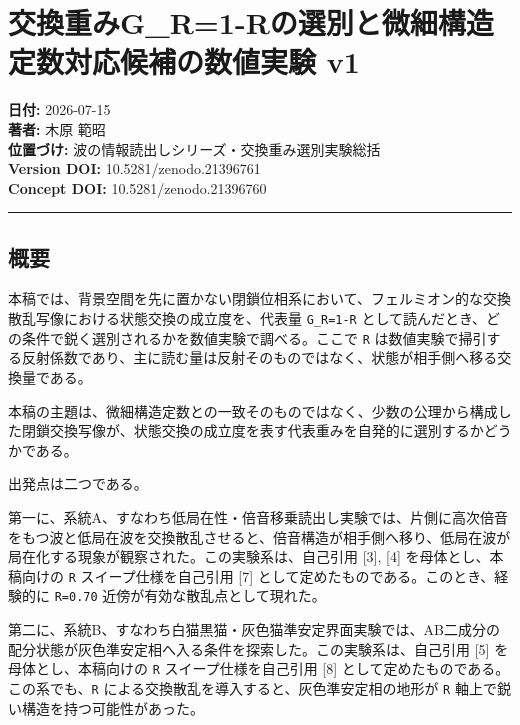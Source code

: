 \documentclass[
]{article}
\author{}
\date{}
\begin{document}
\section{交換重みG\_R=1-Rの選別と微細構造定数対応候補の数値実験
v1}\label{ux4ea4ux63dbux91cdux307fg_r1-rux306eux9078ux5225ux3068ux5faeux7d30ux69cbux9020ux5b9aux6570ux5bfeux5fdcux5019ux88dcux306eux6570ux5024ux5b9fux9a13-v1}

\textbf{日付:} 2026-07-15\\
\textbf{著者:} 木原 範昭\\
\textbf{位置づけ:} 波の情報読出しシリーズ・交換重み選別実験総括\\
\textbf{Version DOI:} 10.5281/zenodo.21396761\\
\textbf{Concept DOI:} 10.5281/zenodo.21396760

\begin{center}\rule{0.5\linewidth}{0.5pt}\end{center}

\subsection{概要}\label{ux6982ux8981}

本稿では、背景空間を先に置かない閉鎖位相系において、フェルミオン的な交換散乱写像における状態交換の成立度を、代表量
\texttt{G\_R=1-R}
として読んだとき、どの条件で鋭く選別されるかを数値実験で調べる。ここで
\texttt{R}
は数値実験で掃引する反射係数であり、主に読む量は反射そのものではなく、状態が相手側へ移る交換量である。

本稿の主題は、微細構造定数との一致そのものではなく、少数の公理から構成した閉鎖交換写像が、状態交換の成立度を表す代表重みを自発的に選別するかどうかである。

出発点は二つである。

第一に、系統A、すなわち低局在性・倍音移乗読出し実験では、片側に高次倍音をもつ波と低局在波を交換散乱させると、倍音構造が相手側へ移り、低局在波が局在化する現象が観察された。この実験系は、自己引用
{[}3{]}, {[}4{]} を母体とし、本稿向けの \texttt{R}
スイープ仕様を自己引用 {[}7{]}
として定めたものである。このとき、経験的に \texttt{R=0.70}
近傍が有効な散乱点として現れた。

第二に、系統B、すなわち白猫黒猫・灰色猫準安定界面実験では、AB二成分の配分状態が灰色準安定相へ入る条件を探索した。この実験系は、自己引用
{[}5{]} を母体とし、本稿向けの \texttt{R} スイープ仕様を自己引用 {[}8{]}
として定めたものである。この系でも、\texttt{R}
による交換散乱を導入すると、灰色準安定相の地形が \texttt{R}
軸上で鋭い構造を持つ可能性があった。
\end{document}
